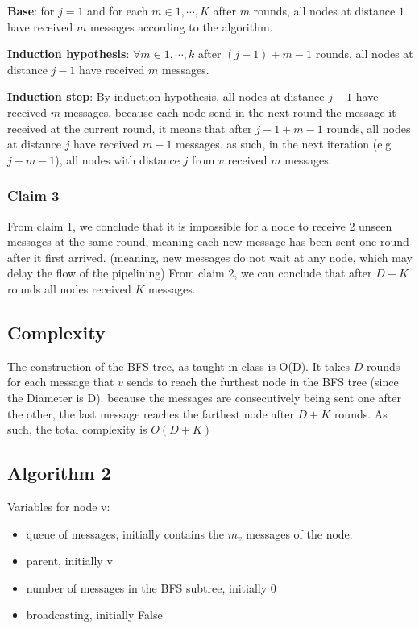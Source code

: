 \documentclass[11pt]{article}
\begin{document}
\textbf{Base}: for $j=1$ and for each $m \in {1,\cdots,K}$ after $m$ rounds, all nodes at distance $1$ have received $m$ messages according to the algorithm.

\textbf{Induction hypothesis}: $\forall m\in{1,\cdots,k}$ after $(j-1)+m-1 $ rounds, all nodes at distance $j-1$ have received $m$ messages. 

\textbf{Induction step}: By induction hypothesis, all nodes at distance $j-1$ have received $m$ messages. because each node send in the next round the message it received at the current round, it means that after $j - 1 + m - 1$ rounds, all nodes at distance $j$ have received $m-1$ messages. as such, in the next iteration (e.g $j +m -1$), all nodes with distance $j$ from $v$ received $m$ messages.

\subsubsection{Claim 3}
From claim 1, we conclude that it is impossible for a node to receive 2 unseen messages at the same round, meaning each new message has been sent one round after it first arrived. (meaning, new messages do not wait at any node, which may delay the flow of the pipelining)
From claim 2, we can conclude that after $D+K$ rounds all nodes received $K$ messages. 

\subsection*{Complexity}
The construction of the BFS tree, as taught in class is O(D). It takes $D$ rounds for each message that $v$ sends to reach the furthest node in the BFS tree (since the Diameter is D). because the messages are consecutively being sent one after the other, the last message reaches the farthest node after $D+K$ rounds. As such, the total complexity is $O(D+K)$



\subsection{Algorithm 2}
Variables for node v:
\begin{itemize}
    \item queue of messages, initially contains the $m_v$ messages of the node.
    \item parent, initially v
    \item number of messages in the BFS subtree, initially $0$
    \item broadcasting, initially False
\end{itemize}
\end{document}
